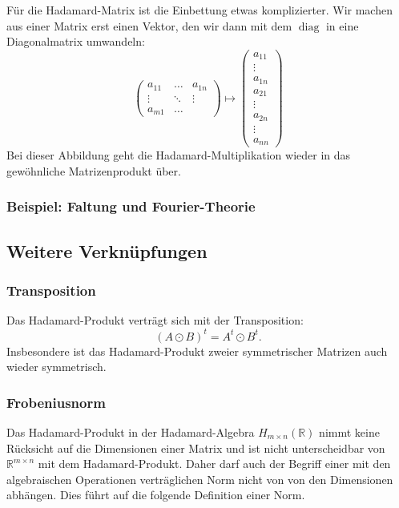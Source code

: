 Für die Hadamard-Matrix ist die Einbettung etwas komplizierter.
Wir machen aus einer Matrix erst einen Vektor, den wir dann mit
dem $\operatorname{diag}$ in eine Diagonalmatrix umwandeln:
\[
\begin{pmatrix}
a_{11}&\dots&a_{1n}\\
\vdots&\ddots&\vdots\\
a_{m1}&\dots
\end{pmatrix}
\mapsto
\begin{pmatrix}
a_{11}\\
\vdots\\
a_{1n}\\
a_{21}\\
\vdots\\
a_{2n}\\
\vdots\\
a_{nn}
\end{pmatrix}
\]
Bei dieser Abbildung geht die Hadamard-Multiplikation wieder in
das gewöhnliche Matrizenprodukt über.

\subsubsection{Beispiel: Faltung und Fourier-Theorie}

\subsection{Weitere Verknüpfungen
\label{buch:vektorenmatrizen:subsection:weitere}}

\subsubsection{Transposition}
Das Hadamard-Produkt verträgt sich mit der Transposition:
\[
(A\odot B)^t = A^t \odot B^t.
\]
Insbesondere ist das Hadamard-Produkt zweier symmetrischer Matrizen auch 
wieder symmetrisch.

\subsubsection{Frobeniusnorm}
Das Hadamard-Produkt in der Hadamard-Algebra $H_{m\times n}(\mathbb{R})$
nimmt keine Rücksicht auf die Dimensionen einer Matrix und ist nicht
unterscheidbar von $\mathbb{R}^{m\times n}$ mit dem Hadamard-Produkt.
Daher darf auch der Begriff einer mit den algebraischen Operationen
verträglichen Norm nicht von von den Dimensionen abhängen.
Dies führt auf die folgende Definition einer Norm.

